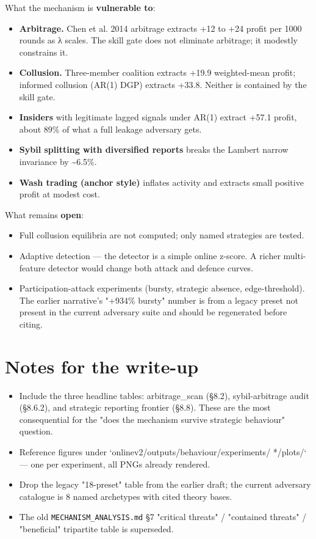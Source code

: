 \documentclass[11pt,a4paper,openany]{report}
\begin{document}
What the mechanism is \textbf{vulnerable to}:

\begin{itemize}
  \item \textbf{Arbitrage.} Chen et al. 2014 arbitrage extracts +12 to +24 profit
    per 1000 rounds as λ scales. The skill gate does not eliminate
    arbitrage; it modestly constrains it.
  \item \textbf{Collusion.} Three-member coalition extracts +19.9 weighted-mean
    profit; informed collusion (AR(1) DGP) extracts +33.8. Neither is
    contained by the skill gate.
  \item \textbf{Insiders} with legitimate lagged signals under AR(1) extract
    +57.1 profit, about 89\% of what a full leakage adversary gets.
  \item \textbf{Sybil splitting with diversified reports} breaks the Lambert
    narrow invariance by \textasciitilde{}6.5\%.
  \item \textbf{Wash trading (anchor style)} inflates activity and extracts small
    positive profit at modest cost.
\end{itemize}

What remains \textbf{open}:

\begin{itemize}
  \item Full collusion equilibria are not computed; only named strategies
    are tested.
  \item Adaptive detection — the detector is a simple online z-score. A
    richer multi-feature detector would change both attack and defence
    curves.
  \item Participation-attack experiments (bursty, strategic absence,
    edge-threshold). The earlier narrative's "+934\% bursty" number is
    from a legacy preset not present in the current adversary suite and
    should be regenerated before citing.
\end{itemize}

\section{Notes for the write-up}

\begin{itemize}
  \item Include the three headline tables: arbitrage\_scan (§8.2),
    sybil-arbitrage audit (§8.6.2), and strategic reporting frontier
    (§8.8). These are the most consequential for the "does the
    mechanism survive strategic behaviour" question.
  \item Reference figures under `onlinev2/outputs/behaviour/experiments/
    */plots/` — one per experiment, all PNGs already rendered.
  \item Drop the legacy "18-preset" table from the earlier draft; the
    current adversary catalogue is 8 named archetypes with cited
    theory bases.
  \item The old \texttt{MECHANISM\_ANALYSIS.md} §7 "critical threats" / "contained
    threats" / "beneficial" tripartite table is superseded.
\end{itemize}
\end{document}
